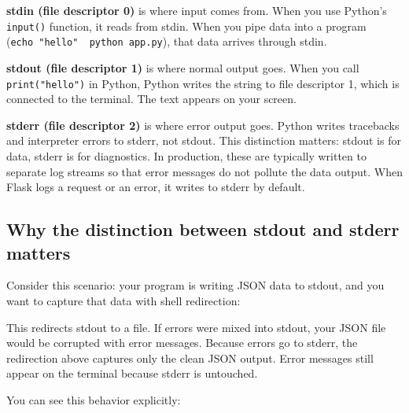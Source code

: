 \textbf{stdin (file descriptor 0)} is where input comes from. When you use Python's \texttt{input()} function, it reads from stdin. When you pipe data into a program (\texttt{echo\ "hello"\ \textbar{}\ python\ app.}\allowbreak{}\texttt{py}), that data arrives through stdin.

\textbf{stdout (file descriptor 1)} is where normal output goes. When you call \texttt{print("hello")} in Python, Python writes the string to file descriptor 1, which is connected to the terminal. The text appears on your screen.

\textbf{stderr (file descriptor 2)} is where error output goes. Python writes tracebacks and interpreter errors to stderr, not stdout. This distinction matters: stdout is for data, stderr is for diagnostics. In production, these are typically written to separate log streams so that error messages do not pollute the data output. When Flask logs a request or an error, it writes to stderr by default.

\subsection*{Why the distinction between stdout and stderr matters}\label{01-command-to-process:why-the-distinction-between-stdout-and-stderr-matters}

Consider this scenario: your program is writing JSON data to stdout, and you want to capture that data with shell redirection:

\begin{codebox}[short]

\begin{Shaded}
\begin{Highlighting}[]
\OperatorTok{\textgreater{}}
\end{Highlighting}
\end{Shaded}

\end{codebox}

\noindent{}This redirects stdout to a file. If errors were mixed into stdout, your JSON file would be corrupted with error messages. Because errors go to stderr, the redirection above captures only the clean JSON output. Error messages still appear on the terminal because stderr is untouched.

You can see this behavior explicitly:


